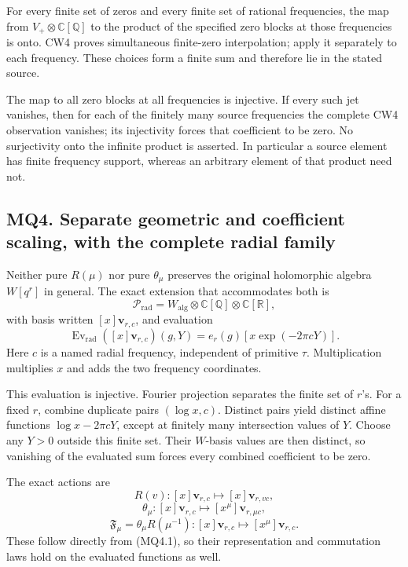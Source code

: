For every finite set of zeros and every finite set of rational
frequencies, the map from \(V_+\otimes\mathbb C[\mathbb Q]\) to the
product of the specified zero blocks at those frequencies is onto. CW4
proves simultaneous finite-zero interpolation; apply it separately to
each frequency. These choices form a finite sum and therefore lie in the
stated source.

The map to all zero blocks at all frequencies is injective. If every
such jet vanishes, then for each of the finitely many source frequencies
the complete CW4 observation vanishes; its injectivity forces that
coefficient to be zero. No surjectivity onto the infinite product is
asserted. In particular a source element has finite frequency support,
whereas an arbitrary element of that product need not.

\subsection{MQ4. Separate geometric and coefficient scaling, with the
complete radial
family}\label{mq4.-separate-geometric-and-coefficient-scaling-with-the-complete-radial-family}

Neither pure \(R(\mu)\) nor pure \(\theta_\mu\) preserves the original
holomorphic algebra \(W[q^r]\) in general. The exact extension that
accommodates both is \[
\mathcal P_{\mathrm{rad}}
=W_{\mathrm{alg}}\otimes\mathbb C[\mathbb Q]\otimes\mathbb C[\mathbb R],
\] with basis written \([x]\mathbf v_{r,c}\), and evaluation \[
\operatorname{Ev}_{\mathrm{rad}}([x]\mathbf v_{r,c})(g,Y)
=e_r(g)[x\exp(-2\pi cY)].
\tag{MQ4.1}
\] Here \(c\) is a named radial frequency, independent of primitive
\(\tau\). Multiplication multiplies \(x\) and adds the two frequency
coordinates.

This evaluation is injective. Fourier projection separates the finite
set of \(r\)'s. For a fixed \(r\), combine duplicate pairs
\((\log x,c)\). Distinct pairs yield distinct affine functions
\(\log x-2\pi cY\), except at finitely many intersection values of
\(Y\). Choose any \(Y>0\) outside this finite set. Their \(W\)-basis
values are then distinct, so vanishing of the evaluated sum forces every
combined coefficient to be zero.

The exact actions are \[
R(v):[x]\mathbf v_{r,c}\longmapsto[x]\mathbf v_{r,vc},
\] \[
\theta_\mu:[x]\mathbf v_{r,c}\longmapsto[x^\mu]\mathbf v_{r,\mu c},
\] \[
\mathfrak F_\mu=\theta_\mu R(\mu^{-1}):
[x]\mathbf v_{r,c}\longmapsto[x^\mu]\mathbf v_{r,c}.
\tag{MQ4.2}
\] These follow directly from (MQ4.1), so their representation and
commutation laws hold on the evaluated functions as well.

